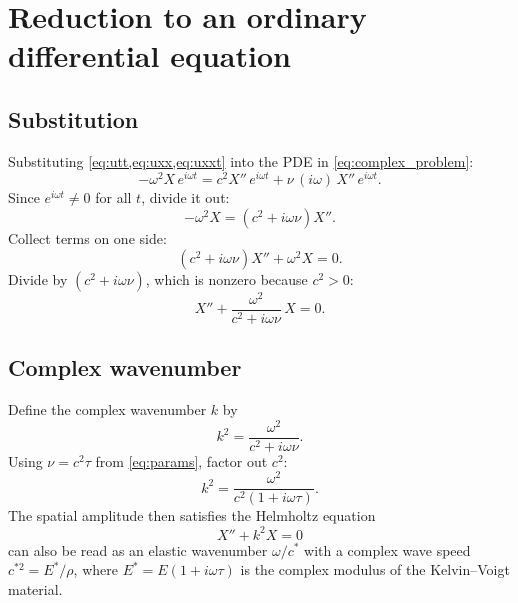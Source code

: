 \section{Reduction to an ordinary differential equation}

\subsection{Substitution}

Substituting \cref{eq:utt,eq:uxx,eq:uxxt} into the PDE in \cref{eq:complex_problem}:
\begin{equation}
  -\omega^2 X\, e^{i\omega t}
  = c^2 X''\, e^{i\omega t} + \nu\,(i\omega)\, X''\, e^{i\omega t}.
\end{equation}
Since $e^{i\omega t} \neq 0$ for all $t$, divide it out:
\begin{equation}
  -\omega^2 X = \left(c^2 + i\omega\nu\right) X''.
\end{equation}
Collect terms on one side:
\begin{equation}
  \left(c^2 + i\omega\nu\right) X'' + \omega^2 X = 0.
\end{equation}
Divide by $(c^2 + i\omega\nu)$, which is nonzero because $c^2>0$:
\begin{equation}
  X'' + \frac{\omega^2}{c^2 + i\omega\nu}\, X = 0.
\end{equation}

\subsection{Complex wavenumber}

Define the complex wavenumber $k$ by
\begin{equation}
  k^2 = \frac{\omega^2}{c^2 + i\omega\nu}.
  \label{eq:k2_def}
\end{equation}
Using $\nu = c^2\tau$ from \cref{eq:params}, factor out $c^2$:
\begin{equation}
  k^2 = \frac{\omega^2}{c^2\left(1 + i\omega\tau\right)}.
  \label{eq:k2_tau}
\end{equation}
The spatial amplitude then satisfies the Helmholtz equation
\begin{equation}
  \boxed{\;X'' + k^2 X = 0\;}
  \label{eq:helmholtz}
\end{equation}
 can also be read as an elastic wavenumber $\omega/c^*$
with a complex wave speed $c^{*2} = E^*/\rho$, where $E^* = E(1+i\omega\tau)$
is the complex modulus of the Kelvin--Voigt material.


